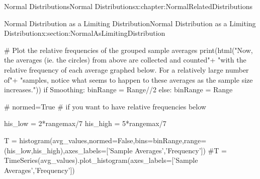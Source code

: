 \documentclass[oneside,10pt,]{book}
\numberwithin{equation}{section}
\begin{document}
\begin{chapterptx}{Normal Distributions}{}{Normal Distributions}{}{}{x:chapter:NormalRelatedDistributions}
\begin{sectionptx}{Normal Distribution as a Limiting Distribution}{}{Normal Distribution as a Limiting Distribution}{}{}{x:section:NormalAsLimitingDistribution}
\begin{sageinput}
    
#  Plot the relative frequencies of the grouped sample averages
    print(html("Now, the averages (ie. the circles) from above are collected and counted\n"+
         "with the relative frequency of each average graphed below.  For a relatively large number of\n"+
         "samples, notice what seems to happen to these averages as the sample size increases."))
    if Smoothing:
        binRange = Range//2
    else:
        binRange = Range
    
    # normed=True  # if you want to have relative frequencies below
    
    his_low = 2*rangemax/7
    his_high = 5*rangemax/7
    
    T = histogram(avg_values,normed=False,bins=binRange,range=(his_low,his_high),axes_labels=['Sample Averages','Frequency']) 
    #T = TimeSeries(avg_values).plot_histogram(axes_labels=['Sample Averages','Frequency'])   
    

\end{sageinput}
\end{sectionptx}
\end{chapterptx}
\end{document}
